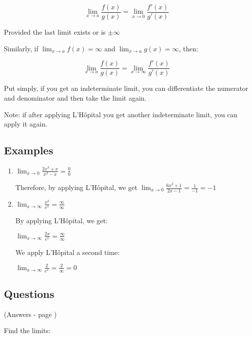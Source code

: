 \documentclass[../main.tex]{subfiles}
\begin{document}
    \[\lim_{x \rightarrow a}\frac{f(x)}{g(x)}=\lim_{x \rightarrow 0}\frac{f'(x)}{g'(x)}\]

Provided the last limit exists or is $\pm \infty$

Similarly, if $\displaystyle \lim_{x \rightarrow a}f(x)=\infty$ and $\displaystyle \lim_{x \rightarrow a}g(x)=\infty$, then:

\[\lim_{x \rightarrow a}\frac{f(x)}{g(x)}=\lim_{x \rightarrow \infty}\frac{f'(x)}{g'(x)}\]

Put simply, if you get an indeterminate limit, you can differentiate the numerator and denominator and then take the limit again.

Note: if after applying L'H\^{o}pital you get another indeterminate limit, you can apply it again.


\subsection*{Examples}
\begin{enumerate}[itemsep=1cm]
    \item
    $\displaystyle \lim_{x\rightarrow 0}\frac{2x^3+x}{x^2-x}=\frac{0}{0}$

    Therefore, by applying L'H\^{o}pital, we get $\displaystyle \lim_{x\rightarrow 0}\frac{6x^2+1}{2x-1}=\frac{1}{-1}=-1$

    \item
    $\displaystyle \lim_{x\rightarrow \infty}\frac{x^2}{e^x}=\frac{\infty}{\infty}$

    By applying L'H\^{o}pital, we get:

    $\displaystyle \lim_{x\rightarrow \infty} \frac{2x}{e^x}=\frac{\infty}{\infty}$

    We apply L'H\^{o}pital a second time:

    $\displaystyle \lim_{x\rightarrow \infty} \frac{2}{e^x}=\frac{2}{\infty}=0$
\end{enumerate}
\pagebreak

\subsection*{Questions}
(Answers - page \pageref*{L'hopital answers})
\label{L'hopital}

Find the limits:
\end{document}
